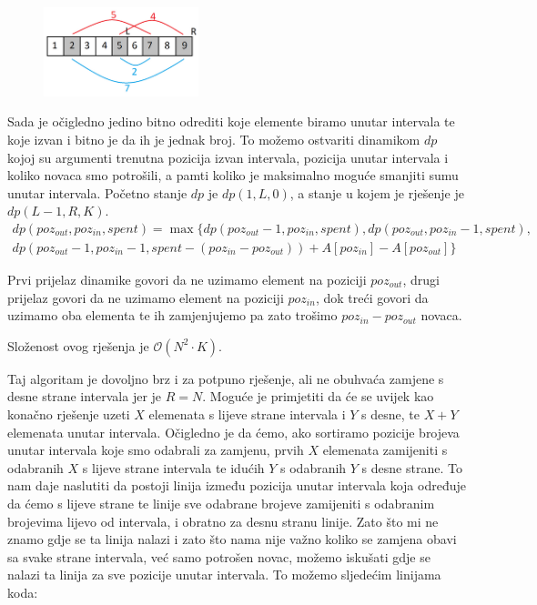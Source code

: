 \documentclass[a4paper]{article}
\begin{document}
\begin{figure}[!htbp]
\centering
\includegraphics[width=0.4\textwidth]{editorial_holding.png}
\end{figure}

Sada je očigledno jedino bitno odrediti koje elemente biramo unutar intervala
te koje izvan i bitno je da ih je jednak broj. To možemo ostvariti dinamikom $dp$
kojoj su argumenti trenutna pozicija izvan intervala, pozicija unutar intervala
i koliko novaca smo potrošili, a pamti koliko je maksimalno moguće smanjiti
sumu unutar intervala. Početno stanje $dp$ je $dp(1, L, 0)$, a stanje u kojem je
rješenje je $dp(L - 1, R, K)$.
\begin{multline}
  dp(poz_{out}, poz_{in}, spent) = \max \biggl\{ dp(poz_{out} - 1, poz_{in}, spent),
  dp(poz_{out}, poz_{in} - 1, spent),\\
  dp(poz_{out} - 1, poz_{in} - 1, spent - (poz_{in} - poz_{out})) + A[poz_{in}] - A[poz_{out}] \biggr\}
\end{multline}

Prvi prijelaz dinamike govori da ne uzimamo element na poziciji $poz_{out}$, drugi
prijelaz govori da ne uzimamo element na poziciji $poz_{in}$, dok treći govori da
uzimamo oba elementa te ih zamjenjujemo pa zato trošimo $poz_{in} - poz_{out}$
novaca.

Složenost ovog rješenja je $\mathcal{O}(N^2 \cdot K)$.

Taj algoritam je dovoljno brz i za potpuno rješenje, ali ne obuhvaća zamjene s
desne strane intervala jer je $R = N$. Moguće je primjetiti da će se uvijek kao
konačno rješenje uzeti $X$ elemenata s lijeve strane intervala i $Y$ s desne, te $X
+ Y$ elemenata unutar intervala. Očigledno je da ćemo, ako sortiramo pozicije
brojeva unutar intervala koje smo odabrali za zamjenu, prvih $X$ elemenata
zamijeniti s odabranih $X$ s lijeve strane intervala te idućih $Y$ s odabranih $Y$ s
desne strane. To nam daje naslutiti da postoji linija između pozicija unutar
intervala koja određuje da ćemo s lijeve strane te linije sve odabrane brojeve
zamijeniti s odabranim brojevima lijevo od intervala, i obratno za desnu stranu
linije. Zato što mi ne znamo gdje se ta linija nalazi i zato što nama nije
važno koliko se zamjena obavi sa svake strane intervala, već samo potrošen
novac, možemo iskušati gdje se nalazi ta linija za sve pozicije unutar
intervala. To možemo sljedećim linijama koda:
\end{document}
